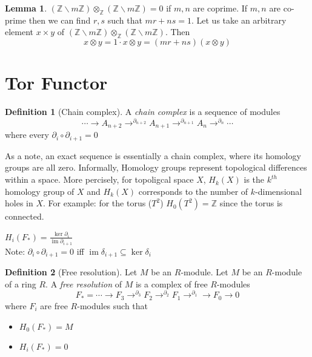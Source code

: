 \documentclass[11pt]{article}
\theoremstyle{definition}
\newtheorem{definition}{Definition}[section]
\newtheorem{lemma}[theorem]{Lemma}
\DeclareMathOperator{\Ima}{im}
\newcommand{\Z}{\mathbb{Z}}
\begin{document}
\begin{lemma}
$(\Z\backslash m\Z)\otimes_{\Z}(\Z\backslash m \Z)=0$ if $m,n$ are coprime.
\proof
If $m,n$ are co-prime then we can find $r,s$ such that $mr+ns=1$. Let us take an arbitrary element $x\times y$ of $(\Z\backslash m\Z)\otimes_{\Z}(\Z\backslash m \Z)$. Then 
$$x\otimes y= 1\cdot x\otimes y=(mr+ns)(x\otimes y)$$
\end{lemma}


\section{Tor Functor}

\begin{definition}[Chain complex]
A \textit{chain complex} is a sequence of modules 
$$\cdots\rightarrow A_{n+2}\rightarrow^{\partial_{n+2}} A_{n+1}\rightarrow^{\partial_{n+1}} A_{n}\rightarrow^{\partial_n} \cdots $$
where every $\partial_{i}\circ \partial_{i+1}=0$
\end{definition}
As a note, an exact sequence is essentially a chain complex, where its homology groups are all zero. Informally, Homology groups represent topological differences within a space. More percisely, for topoligcal space $X$, $H_k(X)$ is the $k^{th}$ homology group of $X$ and $H_k(X)$ corresponds to the number of $k$-dimensional holes in $X$. For example: for the torus ($T^2$) $H_0(T^2)=\mathbb{Z}$ since the torus is connected.  



$H_i(F_{*})=\frac{\ker{\partial_i}}{\Ima{\partial_{i+1}}}$\\

Note: $\partial_{i}\circ \partial_{i+1}=0$ iff $\Ima{\delta_{i+1}}\subseteq\ker{\delta_i}$\\



\begin{definition}[Free resolution]
Let $M$ be an $R$-module.
Let $M$ be an $R$-module of a ring $R$. A \textit{free resolution} of $M$ is a complex of free $R$-modules
$$F_{*}=\cdots\rightarrow F_3\rightarrow ^{\partial_3}F_2\rightarrow^{\partial_2}F_1\rightarrow^{\partial_1}\rightarrow F_0\rightarrow 0 $$
where $F_i$ are free $R$-modules such that
\begin{itemize}
    \item $H_0(F_{*})=M$
    \item $H_i(F_{*})=0$
\end{itemize}
\end{definition}
\end{document}
